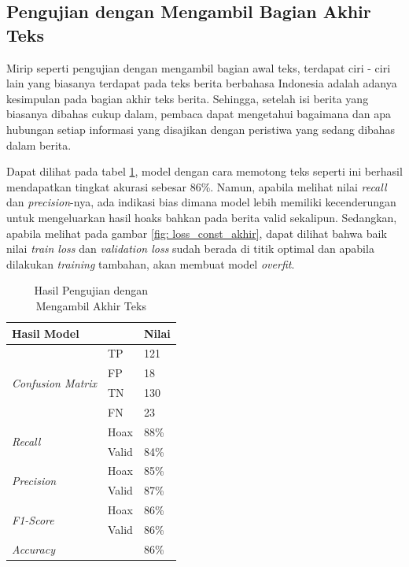\subsection{Pengujian dengan Mengambil Bagian Akhir Teks}

Mirip seperti pengujian dengan mengambil bagian awal teks, terdapat ciri - ciri lain yang biasanya terdapat pada teks berita berbahasa Indonesia adalah adanya kesimpulan pada bagian akhir teks berita. Sehingga, setelah isi berita yang biasanya dibahas cukup dalam, pembaca dapat mengetahui bagaimana dan apa hubungan setiap informasi yang disajikan dengan peristiwa yang sedang dibahas dalam berita.

Dapat dilihat pada tabel \ref{tab: const_akhir}, model dengan cara memotong teks seperti ini berhasil mendapatkan tingkat akurasi sebesar 86\%. Namun, apabila melihat nilai \textit{recall} dan \textit{precision}-nya, ada indikasi bias dimana model lebih memiliki kecenderungan untuk mengeluarkan hasil hoaks bahkan pada berita valid sekalipun. Sedangkan, apabila melihat pada gambar \ref{fig: loss_const_akhir}, dapat dilihat bahwa baik nilai \textit{train loss} dan \textit{validation loss} sudah berada di titik optimal dan apabila dilakukan \textit{training} tambahan, akan membuat model \textit{overfit}.

\begin{table}[h]
    \caption{Hasil Pengujian dengan Mengambil Akhir Teks}
    \label{tab: const_akhir}
    \centering
    \begin{tabular}{|l|l|l|}
        \hline
        \multicolumn{2}{|l|}{\textbf{Hasil Model}} & \textbf{Nilai}        \\ \hline
        \multirow{4}{*}{\textit{Confusion Matrix}} & TP             & 121  \\ \cline{2-3}
                                                   & FP             & 18   \\ \cline{2-3}
                                                   & TN             & 130  \\ \cline{2-3}
                                                   & FN             & 23   \\ \hline
        \multirow{2}{*}{\textit{Recall}}           & Hoax           & 88\% \\ \cline{2-3}
                                                   & Valid          & 84\% \\ \hline
        \multirow{2}{*}{\textit{Precision}}        & Hoax           & 85\% \\ \cline{2-3}
                                                   & Valid          & 87\% \\ \hline
        \multirow{2}{*}{\textit{F1-Score}}         & Hoax           & 86\% \\ \cline{2-3}
                                                   & Valid          & 86\% \\ \hline
        \multicolumn{2}{|l|}{\textit{Accuracy}}    & 86\%                  \\ \hline
    \end{tabular}
\end{table}

